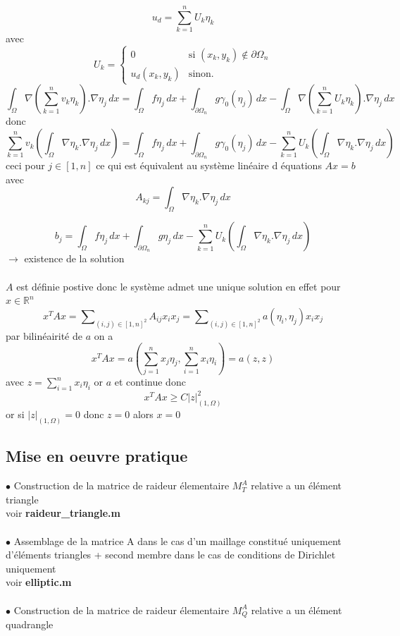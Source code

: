 \documentclass{article}
\begin{document}
$$
u_d = \sum_{k=1}^{n} U_k \eta_k
$$
avec 
$$
U_k = \left\{
    \begin{array}{ll}
        0 & \mbox{si } (x_k, y_k) \notin \partial \Omega_{n} \\
        u_d(x_k, y_k) & \mbox{sinon.}
    \end{array}
\right.
$$
$$
\int_{\Omega} \nabla (\sum_{k=1}^{n} v_k \eta_k) . \nabla \eta_j \,dx = \int_{\Omega} f \eta_j \,dx + \int_{\partial \Omega_{n}} g \gamma_{0}(\eta_j) \,dx - \int_{\Omega} \nabla (\sum_{k=1}^{n} U_k \eta_k) . \nabla \eta_j \,dx
$$
donc 
$$
\sum_{k=1}^{n} v_k (\int_{\Omega} \nabla \eta_k . \nabla \eta_j \,dx) = \int_{\Omega} f \eta_j \,dx + \int_{\partial \Omega_{n}} g \gamma_{0}(\eta_j) \,dx - \sum_{k=1}^{n} U_k (\int_{\Omega} \nabla \eta_k . \nabla \eta_j \,dx)
$$
ceci pour $j \in [1, n]$ ce qui est équivalent au système linéaire d équations $\boxed{Ax = b}$ avec 
$$
A_{kj} = \int_{\Omega} \nabla \eta_k . \nabla \eta_j \,dx
$$

$$
b_j = \int_{\Omega} f \eta_j \,dx + \int_{\partial \Omega_{n}} g \eta_j \,dx - \sum_{k=1}^{n} U_k (\int_{\Omega} \nabla \eta_k . \nabla \eta_j \,dx)
$$
$\rightarrow$ existence de la solution \\ \\
$A$ est définie postive donc le système admet une unique solution en effet pour $x \in \mathbb{R}^n$
$$
x^{T}Ax = \sum\nolimits_{(i, j) \in [1, n]^2} A_{ij} x_i x_j = \sum\nolimits_{(i, j) \in [1, n]^2} a(\eta_i, \eta_j) x_i x_j
$$
par bilinéairité de $a$ on a
$$
x^{T}Ax = a(\sum_{j=1}^{n} x_j \eta_j, \sum_{i=1}^{n} x_i \eta_i) = a(z, z)
$$
avec $z = \sum_{i=1}^{n} x_i \eta_i$ or $a$ et continue donc 
$$
x^{T}Ax \geq C |z|^{2}_{(1, \Omega)}
$$
or si $|z|_{(1, \Omega)} = 0$ donc $z = 0$ alors $x=0$

\subsection{Mise en oeuvre pratique}
$\bullet$ Construction de la matrice de raideur élementaire $M_{T}^{A}$ relative a un élément triangle \\

voir \textbf{raideur\_triangle.m} \\ \\
$\bullet$ Assemblage de la matrice A dans le cas d'un maillage constitué uniquement d'éléments triangles + second membre dans le cas de conditions de Dirichlet uniquement \\

voir \textbf{elliptic.m} \\ \\ 
$\bullet$ Construction de la matrice de raideur élementaire $M_{Q}^{A}$ relative a un élément quadrangle \\
\end{document}
